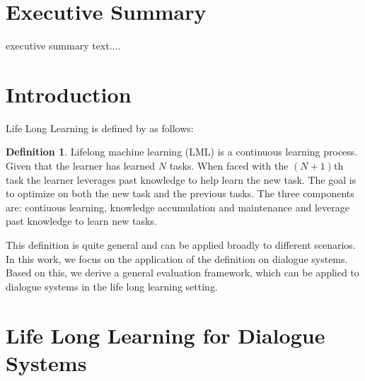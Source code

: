 \documentclass{lihlith}
\theoremstyle{definition}
\newtheorem{definition}{Definition}[section]
\theoremstyle{remark}
\begin{document}


\cleardoublepage
\begin{nwrrevisions}

\end{nwrrevisions}

\cleardoublepage
\section*{Executive Summary}

executive summary text....


\cleardoublepage
\tableofcontents
\cleardoublepage



\section{Introduction}
\label{sec:introduction}

Life Long Learning is defined by \cite{chen2016lifelong} as follows: 

\theoremstyle{definition}
\begin{definition}{Lifelong machine learning (LML)} is a continuous learning process. Given that the learner has learned $N$ tasks. When faced with the $(N+1)$th task the learner leverages past knowledge to help learn the new task. The goal is to optimize on both the new task and the previous tasks. The three components are: contiuous learning, knowledge accumulation and maintenance and leverage past knowledge to learn new tasks. 
\end{definition}
This definition is quite general and can be applied broadly to different scenarios. In this work, we focus on the application of the definition on dialogue systems. Based on this, we derive a general evaluation framework, which can be applied to dialogue systems in the life long learning setting. 


\section{Life Long Learning for Dialogue Systems}
\label{sec:lll4ds}
\end{document}
